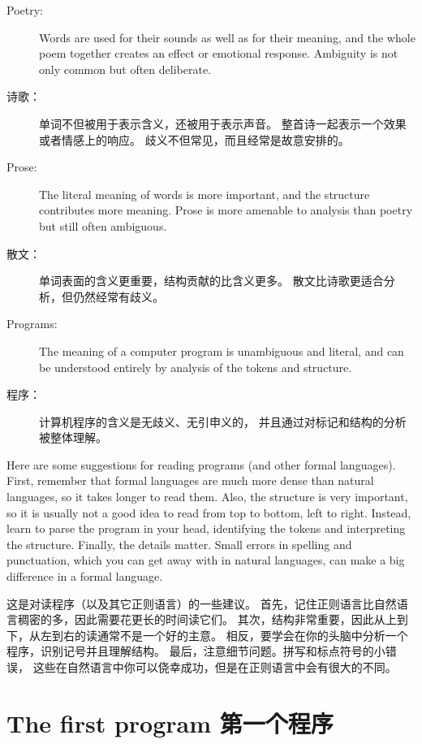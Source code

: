 \documentclass[10pt]{book}
\begin{document}
\begin{CJK}{UTF8}{gbsn}
\begin{description}
\item[Poetry:] Words are used for their sounds as well as for
their meaning, and the whole poem together creates an effect or
emotional response.  Ambiguity is not only common but often
deliberate.

\item[诗歌：] 单词不但被用于表示含义，还被用于表示声音。
整首诗一起表示一个效果或者情感上的响应。
歧义不但常见，而且经常是故意安排的。

\item[Prose:] The literal meaning of words is more important,
and the structure contributes more meaning.  Prose is more amenable to
analysis than poetry but still often ambiguous.

\item[散文：] 单词表面的含义更重要，结构贡献的比含义更多。
散文比诗歌更适合分析，但仍然经常有歧义。

\item[Programs:] The meaning of a computer program is unambiguous
and literal, and can be understood entirely by analysis of the
tokens and structure.

\item[程序：] 计算机程序的含义是无歧义、无引申义的，
并且通过对标记和结构的分析被整体理解。

\end{description}

Here are some suggestions for reading programs (and other formal
languages).  First, remember that formal languages are much more dense
than natural languages, so it takes longer to read them.  Also, the
structure is very important, so it is usually not a good idea to read
from top to bottom, left to right.  Instead, learn to parse the
program in your head, identifying the tokens and interpreting the
structure.  Finally, the details matter.  Small errors in
spelling and punctuation, which you can get away
with in natural languages, can make a big difference in a formal
language.

这是对读程序（以及其它正则语言）的一些建议。
首先，记住正则语言比自然语言稠密的多，因此需要花更长的时间读它们。
其次，结构非常重要，因此从上到下，从左到右的读通常不是一个好的主意。
相反，要学会在你的头脑中分析一个程序，识别记号并且理解结构。
最后，注意细节问题。拼写和标点符号的小错误，
这些在自然语言中你可以侥幸成功，但是在正则语言中会有很大的不同。

\section{The first program 第一个程序}
\label{hello}


\end{CJK}
\end{document}
